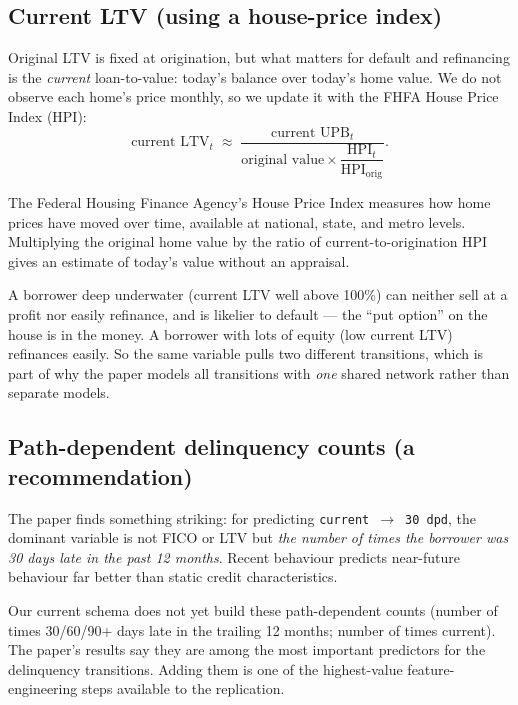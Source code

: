 \documentclass[11pt]{article}
\begin{document}
\subsection{Current LTV (using a house-price index)}

Original LTV is fixed at origination, but what matters for default and refinancing is the
\emph{current} loan-to-value: today's balance over today's home value. We do not observe
each home's price monthly, so we update it with the FHFA House Price Index (HPI):
\[
  \text{current LTV}_t \;\approx\;
  \frac{\text{current UPB}_t}{\text{original value}\times \dfrac{\text{HPI}_t}{\text{HPI}_{\text{orig}}}}.
\]

\begin{jargon}
The Federal Housing Finance Agency's House Price Index measures how home prices have moved
over time, available at national, state, and metro levels. Multiplying the original home
value by the ratio of current-to-origination HPI gives an estimate of today's value
without an appraisal.
\end{jargon}

\begin{intuition}
A borrower deep underwater (current LTV well above 100\%) can neither sell at a profit nor
easily refinance, and is likelier to default --- the ``put option'' on the house is in
the money. A borrower with lots of equity (low current LTV) refinances easily. So the same
variable pulls two different transitions, which is part of why the paper models all
transitions with \emph{one} shared network rather than separate models.
\end{intuition}

\subsection{Path-dependent delinquency counts (a recommendation)}

The paper finds something striking: for predicting \texttt{current}~$\to$~\texttt{30 dpd},
the dominant variable is not FICO or LTV but \emph{the number of times the borrower was 30
days late in the past 12 months}. Recent behaviour predicts near-future behaviour far
better than static credit characteristics.

\begin{keyidea}
Our current schema does not yet build these path-dependent counts (number of times 30/60/90+
days late in the trailing 12 months; number of times current). The paper's results say
they are among the most important predictors for the delinquency transitions. Adding them
is one of the highest-value feature-engineering steps available to the replication.
\end{keyidea}
\end{document}
